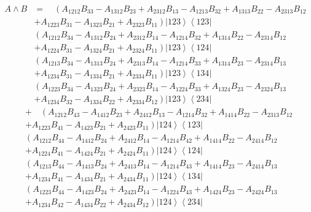\documentclass[aps,preprint]{revtex4}%
\begin{document}
\begin{align}
A\wedge B &  =\quad\left(  A_{1212}B_{33}-A_{1312}B_{23}+A_{2312}%
B_{13}-A_{1213}B_{32}+A_{1313}B_{22}-A_{2313}B_{12}\right.  \nonumber\\
&  \left.  +A_{1223}B_{31}-A_{1323}B_{21}+A_{2323}B_{11}\right)  \left\vert
123\right\rangle \left\langle 123\right\vert \nonumber\\
&  \left(  A_{1212}B_{34}-A_{1312}B_{24}+A_{2312}B_{14}-A_{1214}%
B_{32}+A_{1314}B_{22}-A_{2314}B_{12}\right.  \nonumber\\
&  \left.  +A_{1224}B_{31}-A_{1324}B_{21}+A_{2324}B_{11}\right)  \left\vert
123\right\rangle \left\langle 124\right\vert \nonumber\\
&  \left(  A_{1213}B_{34}-A_{1313}B_{24}+A_{2313}B_{14}-A_{1214}%
B_{33}+A_{1314}B_{23}-A_{2314}B_{13}\right.  \nonumber\\
&  \left.  +A_{1234}B_{31}-A_{1334}B_{21}+A_{2334}B_{11}\right)  \left\vert
123\right\rangle \left\langle 134\right\vert \nonumber\\
&  \left(  A_{1223}B_{34}-A_{1323}B_{24}+A_{2323}B_{14}-A_{1224}%
B_{33}+A_{1324}B_{23}-A_{2324}B_{13}\right.  \nonumber\\
&  \left.  +A_{1234}B_{32}-A_{1334}B_{22}+A_{2334}B_{12}\right)  \left\vert
123\right\rangle \left\langle 234\right\vert
\end{align}%
\begin{align}
&  +\quad\left(  A_{1212}B_{43}-A_{1412}B_{23}+A_{2412}B_{13}-A_{1214}%
B_{32}+A_{1414}B_{22}-A_{2313}B_{12}\right.  \nonumber\\
&  \left.  +A_{1223}B_{41}-A_{1423}B_{21}+A_{2423}B_{11}\right)  \left\vert
124\right\rangle \left\langle 123\right\vert \nonumber\\
&  \left(  A_{1212}B_{44}-A_{1412}B_{24}+A_{2412}B_{14}-A_{1214}%
B_{42}+A_{1414}B_{22}-A_{2414}B_{12}\right.  \nonumber\\
&  \left.  +A_{1224}B_{41}-A_{1424}B_{21}+A_{2424}B_{11}\right)  \left\vert
124\right\rangle \left\langle 124\right\vert \nonumber\\
&  \left(  A_{1213}B_{44}-A_{1413}B_{24}+A_{2413}B_{14}-A_{1214}%
B_{43}+A_{1414}B_{23}-A_{2414}B_{13}\right.  \nonumber\\
&  \left.  +A_{1234}B_{41}-A_{1434}B_{21}+A_{2434}B_{11}\right)  \left\vert
124\right\rangle \left\langle 134\right\vert \nonumber\\
&  \left(  A_{1223}B_{44}-A_{1423}B_{24}+A_{2423}B_{14}-A_{1224}%
B_{43}+A_{1424}B_{23}-A_{2424}B_{13}\right.  \nonumber\\
&  \left.  +A_{1234}B_{42}-A_{1434}B_{22}+A_{2434}B_{12}\right)  \left\vert
124\right\rangle \left\langle 234\right\vert
\end{align}%
\end{document}
